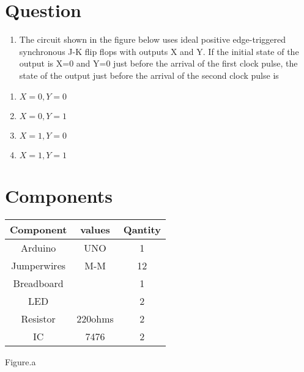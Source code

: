 \documentclass[journal,12pt]{article}
\title{\mytitle}
\author{\myauthor\hspace{1em}\\\contact\\IITH\hspace{0.5em}-\hspace{0.6em}\mymodule}
\date{20-07-2023}
\begin{document}
\theoremstyle{definition}
\newtheorem{theorem}{Theorem}[section]
\newtheorem{problem}{Problem}
\newtheorem{proposition}{Proposition}[section]
\newtheorem{lemma}{Lemma}[section]
\newtheorem{corollary}[theorem]{Corollary}
\newtheorem{example}{Example}[section]
\newtheorem{definition}{Definition}[section]
\newcommand{\BEQA}{\begin{eqnarray}}
\newcommand{\EEQA}{\end{eqnarray}}
\newcommand{\define}{\stackrel{\triangle}{=}}

\vspace{3cm}
\maketitle
\tableofcontents
\pagebreak
\section{Question}
\begin{enumerate}
    \item The circuit shown in the figure below uses ideal positive edge-triggered synchronous J-K flip flops with outputs X and Y. If the initial state of the output is X=0 and Y=0 just before the arrival of the first clock pulse, the state of the output just before the arrival of the second clock pulse is
\end{enumerate}
\begin{figure}[h]
        \centering
	
	\caption{}
\end{figure}
\begin{enumerate}
    \item $X=0, Y=0$
    \item $X=0, Y=1$
    \item $X=1, Y=0$
    \item $X=1, Y=1$
\end{enumerate}
\section{Components}
\begin{table}[h]
\centering
\begin{tabular}{|c|c|c|}
\hline
  \textbf{Component}& \textbf{values} & \textbf{Qantity}\\
\hline
  Arduino & UNO & 1 \\
\hline
  Jumperwires & M-M & 12 \\
\hline
  Breadboard & & 1 \\
\hline
  LED & & 2\\
\hline
  Resistor & 220ohms & 2 \\
\hline
  IC & 7476 & 2 \\
\hline
\end{tabular}
\end{table}
\begin{center}
Figure.a
\end{center}
\end{document}

